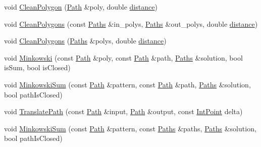 \begin{DoxyCompactItemize}
\item 
void \mbox{\hyperlink{namespace_clipper_lib_a819f3ac34feed7ca8c64c54bc534eb1b}{Clean\+Polygon}} (\mbox{\hyperlink{namespace_clipper_lib_af39c8fe00f278f18cc8142fef41242da}{Path}} \&poly, double \mbox{\hyperlink{unwrapping_8cc_ac6bcc6db62057bda0b6195a11578fdfa}{distance}})
\item 
void \mbox{\hyperlink{namespace_clipper_lib_a770cbc6ce4f16d02b8fe27c5abf6159c}{Clean\+Polygons}} (const \mbox{\hyperlink{namespace_clipper_lib_a4bab1d9e10805fa6f1fd3b78c56efcfe}{Paths}} \&in\+\_\+polys, \mbox{\hyperlink{namespace_clipper_lib_a4bab1d9e10805fa6f1fd3b78c56efcfe}{Paths}} \&out\+\_\+polys, double \mbox{\hyperlink{unwrapping_8cc_ac6bcc6db62057bda0b6195a11578fdfa}{distance}})
\item 
void \mbox{\hyperlink{namespace_clipper_lib_aeee397f9f7e7cb5f0bb4723b7c4969e9}{Clean\+Polygons}} (\mbox{\hyperlink{namespace_clipper_lib_a4bab1d9e10805fa6f1fd3b78c56efcfe}{Paths}} \&polys, double \mbox{\hyperlink{unwrapping_8cc_ac6bcc6db62057bda0b6195a11578fdfa}{distance}})
\item 
void \mbox{\hyperlink{namespace_clipper_lib_a63c9e744bc436b681c98c2f238e22455}{Minkowski}} (const \mbox{\hyperlink{namespace_clipper_lib_af39c8fe00f278f18cc8142fef41242da}{Path}} \&poly, const \mbox{\hyperlink{namespace_clipper_lib_af39c8fe00f278f18cc8142fef41242da}{Path}} \&path, \mbox{\hyperlink{namespace_clipper_lib_a4bab1d9e10805fa6f1fd3b78c56efcfe}{Paths}} \&solution, bool is\+Sum, bool is\+Closed)
\item 
void \mbox{\hyperlink{namespace_clipper_lib_ad12b5697c25579dce65d369a2e3cf608}{Minkowski\+Sum}} (const \mbox{\hyperlink{namespace_clipper_lib_af39c8fe00f278f18cc8142fef41242da}{Path}} \&pattern, const \mbox{\hyperlink{namespace_clipper_lib_af39c8fe00f278f18cc8142fef41242da}{Path}} \&path, \mbox{\hyperlink{namespace_clipper_lib_a4bab1d9e10805fa6f1fd3b78c56efcfe}{Paths}} \&solution, bool path\+Is\+Closed)
\item 
void \mbox{\hyperlink{namespace_clipper_lib_a3fd004390023c8780f3b60e728d8ab8f}{Translate\+Path}} (const \mbox{\hyperlink{namespace_clipper_lib_af39c8fe00f278f18cc8142fef41242da}{Path}} \&input, \mbox{\hyperlink{namespace_clipper_lib_af39c8fe00f278f18cc8142fef41242da}{Path}} \&output, const \mbox{\hyperlink{struct_clipper_lib_1_1_int_point}{Int\+Point}} delta)
\item 
void \mbox{\hyperlink{namespace_clipper_lib_ae4893aa579fd7c46ce695fd3d1c66e64}{Minkowski\+Sum}} (const \mbox{\hyperlink{namespace_clipper_lib_af39c8fe00f278f18cc8142fef41242da}{Path}} \&pattern, const \mbox{\hyperlink{namespace_clipper_lib_a4bab1d9e10805fa6f1fd3b78c56efcfe}{Paths}} \&paths, \mbox{\hyperlink{namespace_clipper_lib_a4bab1d9e10805fa6f1fd3b78c56efcfe}{Paths}} \&solution, bool path\+Is\+Closed)

\end{DoxyCompactItemize}
